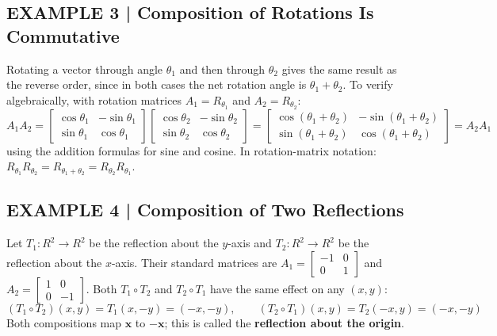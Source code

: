 \documentclass{article}
\theoremstyle{mystyle}
\begin{document}
\subsection*{EXAMPLE 3 | Composition of Rotations Is Commutative}
Rotating a vector through angle $\theta_1$ and then through $\theta_2$ gives the same result as the reverse order, since in both cases the net rotation angle is $\theta_1+\theta_2$. To verify algebraically, with rotation matrices $A_1=R_{\theta_1}$ and $A_2=R_{\theta_2}$:
\[
A_1A_2=\begin{bmatrix}\cos\theta_1&-\sin\theta_1\\\sin\theta_1&\cos\theta_1\end{bmatrix}\begin{bmatrix}\cos\theta_2&-\sin\theta_2\\\sin\theta_2&\cos\theta_2\end{bmatrix}=\begin{bmatrix}\cos(\theta_1+\theta_2)&-\sin(\theta_1+\theta_2)\\\sin(\theta_1+\theta_2)&\cos(\theta_1+\theta_2)\end{bmatrix}=A_2A_1
\]
using the addition formulas for sine and cosine. In rotation-matrix notation: $R_{\theta_1}R_{\theta_2}=R_{\theta_1+\theta_2}=R_{\theta_2}R_{\theta_1}$.

\subsection*{EXAMPLE 4 | Composition of Two Reflections}
Let $T_1:R^2\to R^2$ be the reflection about the $y$-axis and $T_2:R^2\to R^2$ be the reflection about the $x$-axis. Their standard matrices are $A_1=\begin{bmatrix}-1&0\\0&1\end{bmatrix}$ and $A_2=\begin{bmatrix}1&0\\0&-1\end{bmatrix}$. Both $T_1\circ T_2$ and $T_2\circ T_1$ have the same effect on any $(x,y)$:
\[
(T_1\circ T_2)(x,y)=T_1(x,-y)=(-x,-y),\qquad
(T_2\circ T_1)(x,y)=T_2(-x,y)=(-x,-y)
\]
Both compositions map $\mathbf{x}$ to $-\mathbf{x}$; this is called the \textbf{reflection about the origin}.
\end{document}
